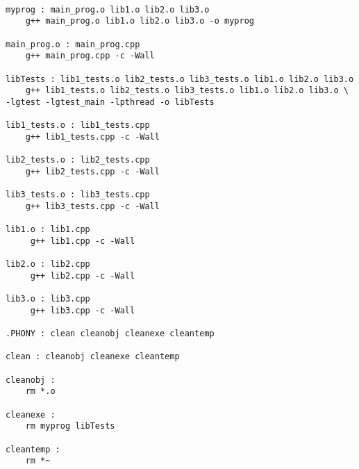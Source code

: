 \documentclass[]{tufte-handout}
\begin{document}
\begin{verbatim}

myprog : main_prog.o lib1.o lib2.o lib3.o
    g++ main_prog.o lib1.o lib2.o lib3.o -o myprog

main_prog.o : main_prog.cpp
    g++ main_prog.cpp -c -Wall

libTests : lib1_tests.o lib2_tests.o lib3_tests.o lib1.o lib2.o lib3.o
    g++ lib1_tests.o lib2_tests.o lib3_tests.o lib1.o lib2.o lib3.o \
-lgtest -lgtest_main -lpthread -o libTests

lib1_tests.o : lib1_tests.cpp
    g++ lib1_tests.cpp -c -Wall

lib2_tests.o : lib2_tests.cpp
    g++ lib2_tests.cpp -c -Wall

lib3_tests.o : lib3_tests.cpp
    g++ lib3_tests.cpp -c -Wall

lib1.o : lib1.cpp
     g++ lib1.cpp -c -Wall
     
lib2.o : lib2.cpp
     g++ lib2.cpp -c -Wall

lib3.o : lib3.cpp
     g++ lib3.cpp -c -Wall

.PHONY : clean cleanobj cleanexe cleantemp

clean : cleanobj cleanexe cleantemp

cleanobj : 
    rm *.o

cleanexe : 
    rm myprog libTests

cleantemp :
    rm *~
\end{verbatim}
\end{document}
